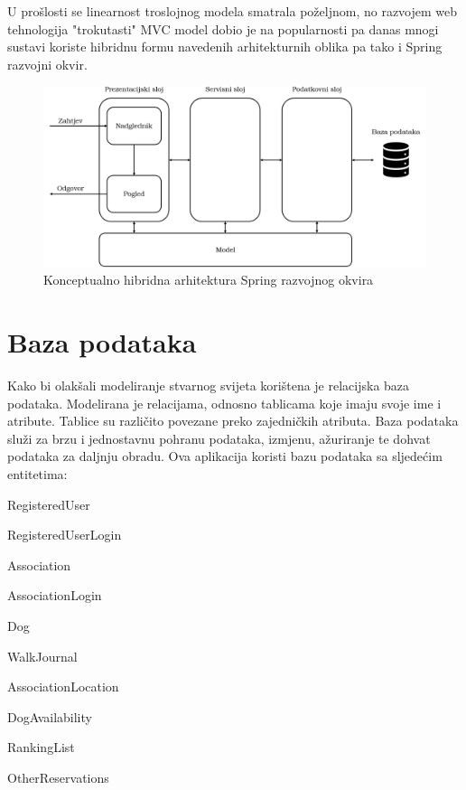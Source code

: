 	\newpage

	
	 U prošlosti se linearnost troslojnog modela smatrala poželjnom, no razvojem web tehnologija "trokutasti" MVC model dobio je na popularnosti pa danas mnogi sustavi koriste hibridnu formu navedenih arhitekturnih oblika pa tako i Spring razvojni okvir. 
	
	\begin{figure}[H]
		\includegraphics[scale=0.47]{slike/hybrid-architecture.PNG} 
		\centering
		\caption{Konceptualno hibridna arhitektura Spring razvojnog okvira}
		\label{fig:hibridna}
	\end{figure}
		

				
		\section{Baza podataka}
			
		
			Kako bi olakšali modeliranje stvarnog svijeta korištena je relacijska baza podataka. Modelirana je relacijama, odnosno tablicama koje imaju svoje ime i atribute. Tablice su različito povezane preko zajedničkih atributa. Baza podataka služi za brzu i jednostavnu pohranu podataka, izmjenu, ažuriranje te dohvat podataka za daljnju obradu. Ova aplikacija koristi bazu podataka sa sljedećim entitetima:
			
			\begin{packed_item}
				
				\item  RegisteredUser
				\item  RegisteredUserLogin
				\item  Association
				\item  AssociationLogin
				\item  Dog
				\item  WalkJournal
				\item  AssociationLocation
				\item  DogAvailability
				\item  RankingList
				\item  OtherReservations
				
			\end{packed_item} 
		
